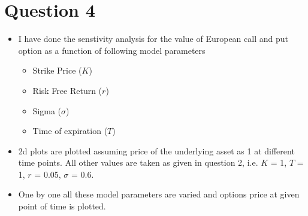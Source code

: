 \documentclass[12pt]{article}
\begin{document}
\begin{figure}[H]
     \begin{center}
    \end{center}
\end{figure}
\vspace{-50pt}
\section*{Question 4}
\begin{itemize}

\item I have done the senstivity analysis for the value of European call and put option as a function of following model parameters
	\begin{itemize}
		\item Strike Price ($K$)
		\item Risk Free Return ($r$)
		\item Sigma ($\sigma$)
		\item Time of expiration ($T$)
	\end{itemize}

\item 2d plots are plotted assuming price of the underlying asset as 1 at different time points. All other values are taken as given in question 2, i.e. $K$ = 1, $T$ = 1, $r$ = 0.05, $\sigma$ = 0.6.

\item One by one all these model parameters are varied and options price at given point of time is plotted. 
\end{itemize}

\begin{figure}[H]
     \begin{center}
%
        \\ %
    \end{center}
\end{figure}
\end{document}
